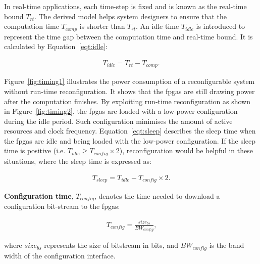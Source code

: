 In real-time applications, each time-step is fixed and is known as the real-time bound $T_{rt}$.
The derived model helps system designers to ensure that the computation time $T_{comp}$ is shorter than $T_{rt}$.
An idle time $T_{idle}$ is introduced to represent the time gap between the computation time and real-time bound.
It is calculated by Equation~\ref{eqt:idle}:

\begin{equation}
\begin{aligned}
T_{idle} = T_{rt} - T_{comp} \mbox{.}
\end{aligned}
\label{eqt:idle}
\end{equation}

Figure~\ref{fig:timing1} illustrates the power consumption of a reconfigurable system without run-time reconfiguration.
It shows that the \glspl{fpga} are still drawing power after the computation finishes.
By exploiting run-time reconfiguration as shown in Figure~\ref{fig:timing2}, the \glspl{fpga} are loaded with a low-power configuration during the idle period.
Such configuration minimises the amount of active resources and clock frequency.
Equation~\ref{eqt:sleep} describes the sleep time when the \glspl{fpga} are idle and being loaded with the low-power configuration.
If the sleep time is positive (i.e. $T_{idle} \geq T_{config} \times 2$), reconfiguration would be helpful in these situations, where the sleep time is expressed as:

\begin{equation}
\begin{aligned}
T_{sleep} = T_{idle} - T_{config} \times 2 \mbox{.}
\end{aligned}
\label{eqt:sleep}
\end{equation}

\textbf{Configuration time}, $T_{config}$, denotes the time needed to download a configuration bit-stream to the \glspl{fpga}:

\begin{equation}
\begin{aligned}
T_{config} = \frac{\mathit{size}_{bs}}{BW_{config}} \mbox{,}
\end{aligned}
\label{eqt:cf}
\end{equation}

where $\mathit{size}_{bs}$ represents the size of bitstream in bits, and $BW_{config}$ is the band width of the configuration interface.

